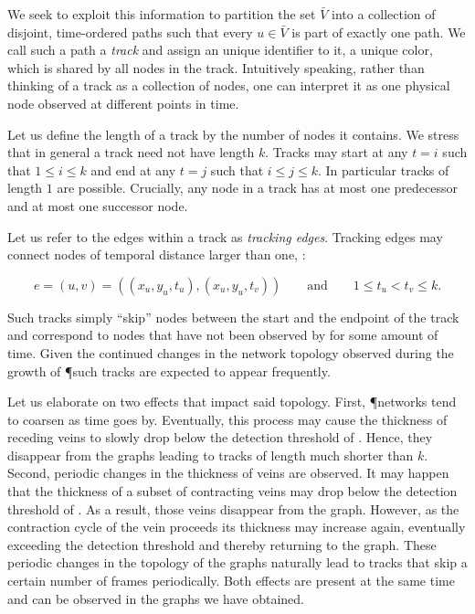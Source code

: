 		We seek to exploit this information to partition the set $\bar{V}$ into a collection of disjoint, time-ordered paths such that every $u \in \bar{V}$ is part of exactly one path. We call such a path a \emph{track} and assign an unique identifier to it, \eg a unique color, which is shared by all nodes in the track. Intuitively speaking, rather than thinking of a track as a collection of nodes, one can interpret it as one physical node observed at different points in time.

		Let us define the length of a track by the number of nodes it contains. We stress that in general a track need not have length $k$. Tracks may start at any $t=i$ such that $1 \le i \le k$ and end at any $t=j$ such that $i \le j \le k$. In particular tracks of length $1$ are possible. Crucially, any node in a track has at most one predecessor and at most one successor node.

		Let us refer to the edges within a track as \emph{tracking edges}. Tracking edges may connect nodes of temporal distance larger than one, \ie:

		\begin{equation*}
			e = (u,v) = ((x_u,y_u,t_u), (x_u,y_u,t_v)) \qquad \text{and} \qquad 1 \le t_u < t_v \le k.
		\end{equation*}

		Such tracks simply ``skip'' nodes between the start and the endpoint of the track and correspond to nodes that have not been observed by \NEFI for some amount of time. Given the continued changes in the network topology observed during the growth of \P such tracks are expected to appear frequently. 

		Let us elaborate on two effects that impact said topology. First, \P networks tend to coarsen as time goes by. Eventually, this process may cause the thickness of receding veins to slowly drop below the detection threshold of \NEFI. Hence, they disappear from the graphs leading to tracks of length much shorter than $k$. Second, periodic changes in the thickness of veins are observed. It may happen that the thickness of a subset of contracting veins may drop below the detection threshold of \NEFI. As a result, those veins disappear from the graph. However, as the contraction cycle of the vein proceeds its thickness may increase again, eventually exceeding the detection threshold and thereby returning to the graph. These periodic changes in the topology of the graphs naturally lead to tracks that skip a certain number of frames periodically. Both effects are present at the same time and can be observed in the graphs we have obtained.

